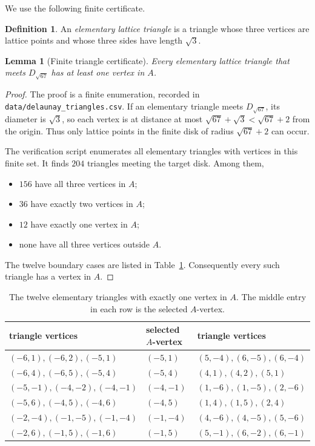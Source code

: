 \documentclass[11pt]{article}
\newtheorem{lemma}[theorem]{Lemma}
\theoremstyle{definition}
\newtheorem{definition}[theorem]{Definition}
\begin{document}
We use the following finite certificate.

\begin{definition}
An \emph{elementary lattice triangle} is a triangle whose three
vertices are lattice points and whose three sides have length $\sqrt3$.
\end{definition}

\begin{lemma}[Finite triangle certificate]
\label{lem:trianglecert}
Every elementary lattice triangle that meets $D_{\sqrt{67}}$ has at
least one vertex in $A$.
\end{lemma}

\begin{proof}
The proof is a finite enumeration, recorded in
\texttt{data/delaunay\_triangles.csv}.  If an elementary triangle meets
$D_{\sqrt{67}}$, its diameter is $\sqrt3$, so each vertex is at
distance at most $\sqrt{67}+\sqrt3<\sqrt{67}+2$ from the origin.  Thus
only lattice points in the finite disk of radius $\sqrt{67}+2$ can
occur.

The verification script enumerates all elementary triangles with
vertices in this finite set.  It finds $204$ triangles meeting the
target disk.  Among them,
\begin{itemize}
  \item $156$ have all three vertices in $A$;
  \item $36$ have exactly two vertices in $A$;
  \item $12$ have exactly one vertex in $A$;
  \item none have all three vertices outside $A$.
\end{itemize}
The twelve boundary cases are listed in Table~\ref{tab:boundary}.
Consequently every such triangle has a vertex in $A$.
\end{proof}

\begin{table}[ht]
\centering
\caption{The twelve elementary triangles with exactly one vertex in
$A$.  The middle entry in each row is the selected $A$-vertex.}
\label{tab:boundary}
\small
\begin{tabular}{@{}lll@{}}
\toprule
triangle vertices & selected $A$-vertex & triangle vertices\\
\midrule
$(-6,1),(-6,2),(-5,1)$&$(-5,1)$&$(5,-4),(6,-5),(6,-4)$\\
$(-6,4),(-6,5),(-5,4)$&$(-5,4)$&$(4,1),(4,2),(5,1)$\\
$(-5,-1),(-4,-2),(-4,-1)$&$(-4,-1)$&$(1,-6),(1,-5),(2,-6)$\\
$(-5,6),(-4,5),(-4,6)$&$(-4,5)$&$(1,4),(1,5),(2,4)$\\
$(-2,-4),(-1,-5),(-1,-4)$&$(-1,-4)$&$(4,-6),(4,-5),(5,-6)$\\
$(-2,6),(-1,5),(-1,6)$&$(-1,5)$&$(5,-1),(6,-2),(6,-1)$\\
\bottomrule
\end{tabular}
\end{table}
\end{document}
